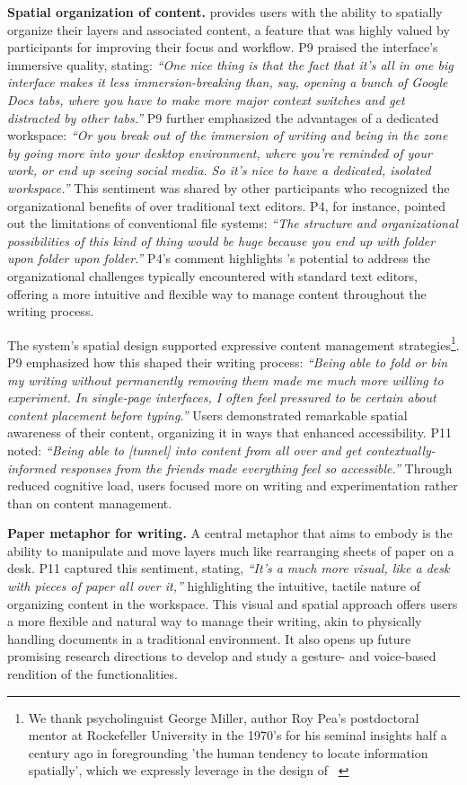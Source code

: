 \textbf{Spatial organization of content.} \system provides users with the ability to spatially organize their layers and associated content, a feature that was highly valued by participants for improving their focus and workflow. P9 praised the interface's immersive quality, stating: \textit{``One nice thing is that the fact that it's all in one big interface makes it less immersion-breaking than, say, opening a bunch of Google Docs tabs, where you have to make more major context switches and get distracted by other tabs.''} P9 further emphasized the advantages of a dedicated workspace: \textit{``Or you break out of the immersion of writing and being in the zone by going more into your desktop environment, where you're reminded of your work, or end up seeing social media. So it's nice to have a dedicated, isolated workspace.''}  This sentiment was shared by other participants who recognized the organizational benefits of \system over traditional text editors. P4, for instance, pointed out the limitations of conventional file systems: \textit{``The structure and organizational possibilities of this kind of thing would be huge because you end up with folder upon folder upon folder.''} P4's comment highlights \system's potential to address the organizational challenges typically encountered with standard text editors, offering a more intuitive and flexible way to manage content throughout the writing process. 

The system's spatial design supported expressive content management strategies\footnote{We thank psycholinguist George Miller, author Roy Pea's postdoctoral mentor at Rockefeller University in the 1970's for his seminal insights half a century ago in foregrounding 'the human tendency to locate information spatially', which we expressly leverage in the design of \system~\cite{millerpsychology}}. P9 emphasized how this shaped their writing process: \textit{``Being able to fold or bin my writing without permanently removing them made me much more willing to experiment. In single-page interfaces, I often feel pressured to be certain about content placement before typing.''} Users demonstrated remarkable spatial awareness of their content, organizing it in ways that enhanced accessibility. P11 noted: \textit{``Being able to [tunnel] into content from all over and get contextually-informed responses from the friends made everything feel so accessible.''} Through reduced cognitive load, users focused more on writing and experimentation rather than on content management.

\textbf{Paper metaphor for writing.} A central metaphor that \system aims to embody is the ability to manipulate and move layers much like rearranging sheets of paper on a desk. P11 captured this sentiment, stating, \textit{``It's a much more visual, like a desk with pieces of paper all over it,''} highlighting the intuitive, tactile nature of organizing content in the workspace. This visual and spatial approach offers users a more flexible and natural way to manage their writing, akin to physically handling documents in a traditional environment. It also opens up future promising research directions to develop and study a gesture- and voice-based rendition of the \system functionalities. 

